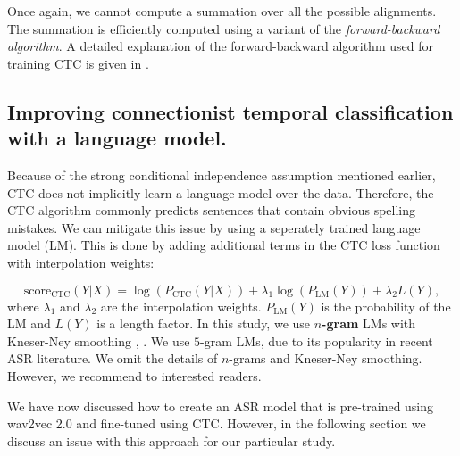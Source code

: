 Once again, we cannot compute a summation over all the possible alignments.
The summation is efficiently computed using a variant of the \emph{forward-backward algorithm}.
A detailed explanation of the forward-backward algorithm used for training CTC is given in \cite{hannun2017sequence}.

\subsection{Improving connectionist temporal classification with a language model.} \label{subsec:lm-boost}
Because of the strong conditional independence assumption mentioned earlier,
CTC does not implicitly learn a language model over the data.
Therefore, the CTC algorithm commonly predicts sentences that contain obvious spelling mistakes.
We can mitigate this issue by using a seperately trained language model (LM).
This is done by adding additional terms in the CTC loss function with interpolation weights:

\begin{equation}
    \text{score}_{\text{CTC}}(Y|X) = \log\left(P_{\text{CTC}}(Y|X)\right) + \lambda_1 \log\left(P_{\text{LM}}(Y)\right) + \lambda_2 L(Y),
\end{equation}
where $\lambda_1$ and $\lambda_2$ are the interpolation weights. $P_{\text{LM}}(Y)$ is the probability of the LM and $L(Y)$ is a length factor.
In this study, we use \textbf{$n$-gram} LMs with Kneser-Ney smoothing \cite{shannon1948}, \cite{ney1994structuring}. 
We use $5$-gram LMs, due to its popularity in recent ASR literature.
We omit the details of $n$-grams and Kneser-Ney smoothing. However, we recommend \cite{jurafskyspeech} to interested readers.

We have now discussed how to create an ASR model that is pre-trained using wav2vec 2.0 and fine-tuned using CTC. 
However, in the following section we discuss an issue with this approach for our particular study.




